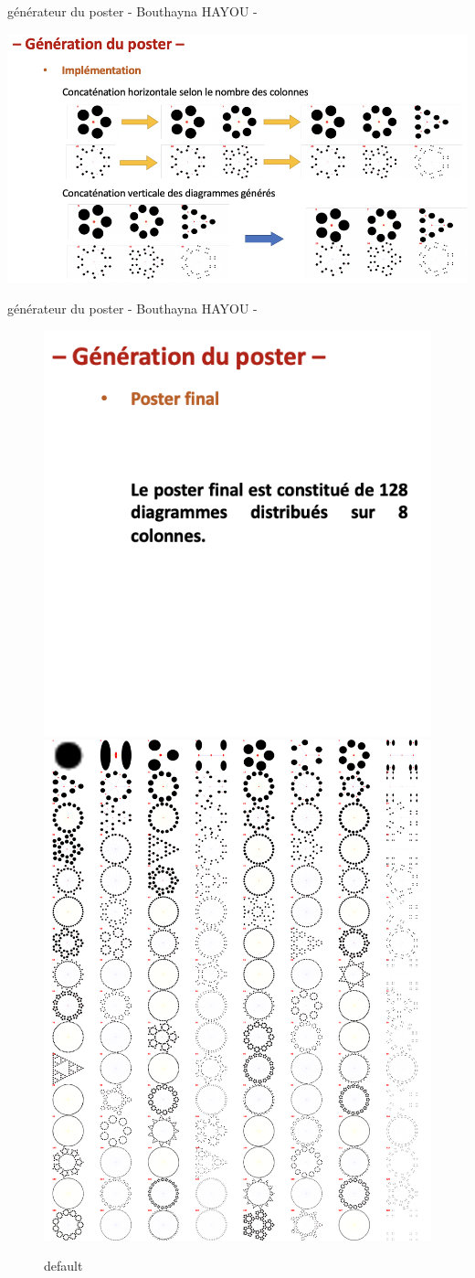 \documentclass[aspectratio=169]{beamer}
\begin{document}
\begin{frame}[fragile=singleslide]{générateur du poster \qquad \qquad \qquad \qquad - Bouthayna HAYOU -}
\begin{center}
    \includegraphics[width=14 cm]{./res/post2.png}
\end{center}
\end{frame}

\begin{frame}[fragile=singleslide]{générateur du poster \qquad \qquad \qquad \qquad - Bouthayna HAYOU -}
\begin{figure}[htp]
\centering
\includegraphics[width=7 cm]{./res/text.png}\hfill
\includegraphics[width=6 cm]{./res/poster.png}
\caption{default}
\label{fig:figure3}
\end{figure}
\end{frame}
\end{document}
